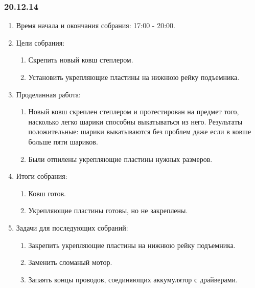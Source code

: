 \subsubsection{20.12.14}
\begin{enumerate}
	
	\item Время начала и окончания собрания: 17:00 - 20:00.
	
	\item Цели собрания: 
	\begin{enumerate}
		
		\item Скрепить новый ковш степлером.
		
		\item Установить укрепляющие пластины на нижнюю рейку подъемника.
		
	\end{enumerate}
	\item Проделанная работа:
	\begin{enumerate}
		
		\item Новый ковш скреплен степлером и протестирован на предмет того, насколько легко шарики способны выкатываться из него. Результаты положительные: шарики выкатываются без проблем даже если в ковше больше пяти шариков.
		
		\item Были отпилены укрепляющие пластины нужных размеров.  
	\end{enumerate}
	
	\item Итоги собрания:
	\begin{enumerate}
		\item Ковш готов.
		
		\item Укрепляющие пластины готовы, но не закреплены.
	\end{enumerate}
	
	\item Задачи для последующих собраний:
	\begin{enumerate}
		\item Закрепить укрепляющие пластины на нижнюю рейку подъемника.
		
		\item Заменить сломаный мотор.
		
		\item Запаять концы проводов, соединяющих аккумулятор с драйверами.		
	\end{enumerate}
\end{enumerate}
\fillpage
